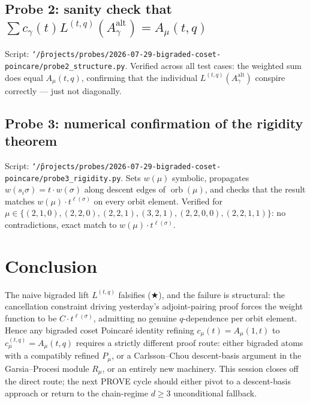 \documentclass[11pt]{article}
\theoremstyle{definition}
\theoremstyle{remark}
\newcommand{\orb}{\operatorname{orb}}
\newcommand{\Aalt}{A^{\mathrm{alt}}}
\begin{document}
\subsection{Probe 2: sanity check that $\sum c_\gamma(t) L^{(t,q)}(\Aalt_\gamma) = A_\mu(t,q)$}
Script: \texttt{\char`\~/projects/probes/2026-07-29-bigraded-coset-poincare/probe2\_structure.py}.
Verified across all test cases: the weighted sum does equal $A_\mu(t,q)$,
confirming that the individual $L^{(t,q)}(\Aalt_\gamma)$ conspire correctly
--- just not diagonally.

\subsection{Probe 3: numerical confirmation of the rigidity theorem}
Script: \texttt{\char`\~/projects/probes/2026-07-29-bigraded-coset-poincare/probe3\_rigidity.py}.
Sets $w(\mu)$ symbolic, propagates $w(s_i \sigma) = t \cdot w(\sigma)$ along
descent edges of $\orb(\mu)$, and checks that the result matches
$w(\mu) \cdot t^{\ell(\sigma)}$ on every orbit element. Verified for
$\mu \in \{(2,1,0),(2,2,0),(2,2,1),(3,2,1),(2,2,0,0),(2,2,1,1)\}$: no
contradictions, exact match to $w(\mu) \cdot t^{\ell(\sigma)}$.

\section{Conclusion}

The naive bigraded lift $L^{(t,q)}$ falsifies (★), and the failure is
structural: the cancellation constraint driving yesterday's adjoint-pairing
proof forces the weight function to be $C \cdot t^{\ell(\sigma)}$, admitting
no genuine $q$-dependence per orbit element. Hence any bigraded coset
Poincar\'e identity refining $c_\mu(t) = A_\mu(1,t)$ to
$c^{(t,q)}_\mu = A_\mu(t,q)$ requires a strictly different proof route:
either bigraded atoms with a compatibly refined $P_\mu$, or a Carlsson--Chou
descent-basis argument in the Garsia--Procesi module $R_\mu$, or an entirely
new machinery. This session closes off the direct route; the next PROVE
cycle should either pivot to a descent-basis approach or return to the
chain-regime $d \ge 3$ unconditional fallback.
\end{document}
